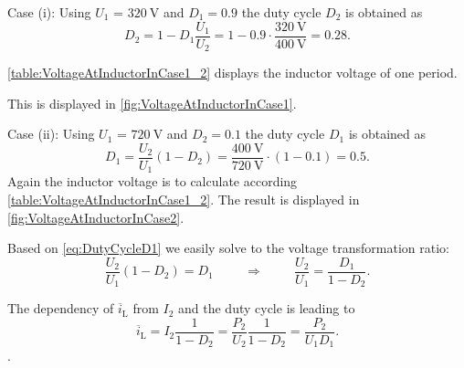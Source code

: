 \begin{solutionblock}
	Case (i): Using $U_\mathrm{1}$ = $\SI{320}{\volt}$ and $D_1 = 0.9$ the duty cycle $D_2$ is obtained as
	\begin{equation}
		D_2 = 1 - D_1 \frac{U_\mathrm{1}}{U_\mathrm{2}} = 1 - 0.9 \cdot \frac{\SI{320}{\volt}}{\SI{400}{\volt}}= 0.28.
	\end{equation}

	\autoref{table:VoltageAtInductorInCase1_2} displays the inductor voltage of one period.
	
	This is displayed in \autoref{fig:VoltageAtInductorInCase1}.
	

	Case (ii): Using $U_\mathrm{1}$ = $\SI{720}{\volt}$ and $D_2 = 0.1$ the duty cycle $D_1$ is obtained as
	\begin{equation}
		D_1 = \frac{U_\mathrm{2}}{U_\mathrm{1}} \left(1 - D_2 \right)= \frac{\SI{400}{\volt}}{\SI{720}{\volt}} \cdot \left(1 - 0.1\right) = 0.5.
		\label{eq:DutyCycleD1}
	\end{equation}
	Again the inductor voltage is to calculate according \autoref{table:VoltageAtInductorInCase1_2}.
	The result is displayed in \autoref{fig:VoltageAtInductorInCase2}.

	

\end{solutionblock}

\begin{solutionblock}
	Based on \eqref{eq:DutyCycleD1} we easily solve to the voltage transformation ratio:
	\begin{equation}
		\frac{U_\mathrm{2}}{U_\mathrm{1}} \left(1 - D_2 \right) = D_1
		\hspace{1cm} \Rightarrow \hspace{1cm}
		\frac{U_\mathrm{2}}{U_\mathrm{1}} = \frac{D_1} {1-D_2}.
	\end{equation}
\end{solutionblock}

\begin{solutionblock}
	The dependency of $\overline{i}_\mathrm{L}$ from $I_\mathrm{2}$ and the duty cycle is leading to
	\begin{equation}
		\overline{i}_\mathrm{L}=I_\mathrm{2} \frac{1}{1-D_2}= \frac{P_\mathrm{2}}{U_\mathrm{2}} \frac{1}{1-D_2}=\frac{P_2}{U_1 D_1}.
	\end{equation}.
\end{solutionblock}

